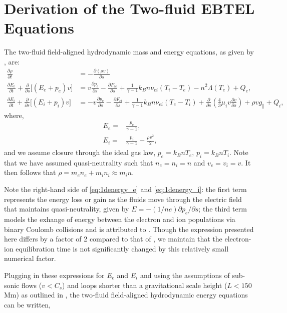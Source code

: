 \documentclass[iop]{emulateapj}
\begin{document}
	\section{Derivation of the Two-fluid EBTEL Equations}
	\label{appendix_two_fluid}
	\par The two-fluid field-aligned hydrodynamic mass and energy equations, as given by \citet{bradshaw_influence_2013}, are:
	\begin{align}
		\frac{\partial\rho}{\partial t} &= -\frac{\partial(\rho v)}{\partial s} \label{eq:1dmass} \\[0.5em]
		\frac{\partial E_e}{\partial t} + \frac{\partial}{\partial s} \lbrack(E_e+p_e)v\rbrack &= v\frac{\partial p_e}{\partial s} - \frac{\partial F_{ce}}{\partial s} + \frac{1}{\gamma - 1}k_Bn\nu_{ei}(T_i-T_e) -n^2\Lambda(T_e)+Q_{e} , \label{eq:1denergy_e} \\[0.5em]
		\frac{\partial E_i}{\partial t} + \frac{\partial }{\partial s}\lbrack(E_i+p_i)v\rbrack &= -v\frac{\partial p_e}{\partial s} - \frac{\partial F_{ci}}{\partial s} + \frac{1}{\gamma - 1}k_Bn\nu_{ei}(T_e-T_i) + \frac{\partial}{\partial s}\left(\frac{4}{3}\mu_iv\frac{\partial v}{\partial s}\right) +\rho v g_{\parallel} + Q_{i},\label{eq:1denergy_i}
	\end{align}
	where,
	\begin{align}
		E_e =& \frac{p_e}{\gamma - 1} \label{eq:ee_closure}, \\[0.5em]
		E_i =& \frac{p_i}{\gamma - 1} + \frac{\rho v^2}{2}, \label{eq:ei_closure}
	\end{align}
	and we assume closure through the ideal gas law, $p_e=k_BnT_e,\,p_i=k_BnT_i$. Note that we have assumed quasi-neutrality such that $n_e=n_i=n$ and $v_e=v_i=v$. It then follows that $\rho=m_en_e+m_in_i\approx m_in$.
	\par Note the right-hand side of \autoref{eq:1denergy_e} and \autoref{eq:1denergy_i}: the first term represents the energy loss or gain as the fluids move through the electric field that maintains quasi-neutrality, given by $E=-(1/ne)\partial p_e/\partial s$; the third term models the exhange of energy between the electron and ion populations via binary Coulomb collisions and is attributed to \citet{braginskii_transport_1965}. Though the expression presented here differs by a factor of 2 compared to that of \citeauthor{braginskii_transport_1965}, we maintain that the electron-ion equilibration time is not significantly changed by this relatively small numerical factor. 
	\par Plugging in these expressions for $E_e$ and $E_i$ and using the assumptions of sub-sonic flows ($v<C_s$) and loops shorter than a gravitational scale height ($L<150$ Mm) as outlined in \citet{klimchuk_highly_2008}, the two-fluid field-aligned hydrodynamic energy equations can be written,
\end{document}
